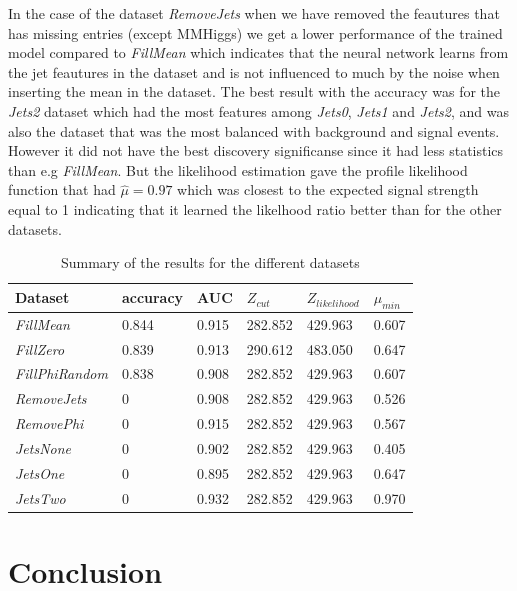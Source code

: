 \documentclass[../../main/main.tex]{subfiles}
\begin{document}
In the case of the dataset \emph{RemoveJets} when we have removed the feautures that has missing entries (except MMHiggs) we get a lower performance of the trained model compared to \emph{FillMean} which indicates that the neural network learns from the jet feautures in the dataset and is not influenced to much by the noise when inserting the mean in the dataset. The best result with the accuracy was for the \emph{Jets2} dataset which had the most features among \emph{Jets0}, \emph{Jets1} and \emph{Jets2}, and was also the dataset that was the most balanced with background and signal events. However it did not have the best discovery significanse since it had less statistics than e.g \emph{FillMean}. But the likelihood estimation gave the profile likelihood function that had \(\hat{\mu}=0.97\) which was closest to the expected signal strength equal to 1 indicating that it learned the likelhood ratio better than for the other datasets.

\begin{table}[H]
 \caption{Summary of the results for the different datasets
 }
    \label{tab:acronyms}
  \centering
  \begin{ruledtabular}
  \begin{tabular}{l|lllll}
    Dataset & accuracy & AUC & \(Z_{cut}\) & \(Z_{likelihood}\) & \(\mu_{min}\)\\
    \hline
    \emph{FillMean} & 0.844 & 0.915 & 282.852 & 429.963 & 0.607 \\
    \emph{FillZero} & 0.839 & 0.913 & 290.612 & 483.050 & 0.647 \\
    \emph{FillPhiRandom} & 0.838 & 0.908 & 282.852 & 429.963 & 0.607 \\
    \hline
    \emph{RemoveJets} & 0 & 0.908 & 282.852 & 429.963 & 0.526 \\
    \emph{RemovePhi} & 0 & 0.915 & 282.852 & 429.963 & 0.567 \\
    \hline
    \emph{JetsNone} & 0 & 0.902 & 282.852 & 429.963 & 0.405 \\
    \emph{JetsOne} & 0 & 0.895 & 282.852 & 429.963 & 0.647 \\
    \emph{JetsTwo} & 0 & 0.932 & 282.852 & 429.963 & 0.970 \\                        
    
  \end{tabular}
  \end{ruledtabular}
\end{table}

\section{Conclusion}
\label{sec:conclusion}
\end{document}
